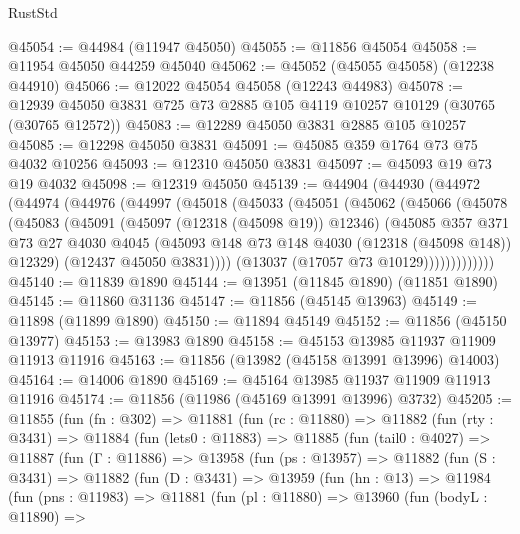 \begin{lexlean}{RustStd}
\begin{coremodule}
@45054 := @44984 (@11947 @45050)
@45055 := @11856 @45054
@45058 := @11954 @45050 @44259 @45040
@45062 := @45052 (@45055 @45058) (@12238 @44910)
@45066 := @12022 @45054 @45058 (@12243 @44983)
@45078 := @12939 @45050 @3831 @725 @73 @2885 @105 @4119 @10257 @10129 (@30765 (@30765 @12572))
@45083 := @12289 @45050 @3831 @2885 @105 @10257
@45085 := @12298 @45050 @3831
@45091 := @45085 @359 @1764 @73 @75 @4032 @10256
@45093 := @12310 @45050 @3831
@45097 := @45093 @19 @73 @19 @4032
@45098 := @12319 @45050
@45139 := @44904
    (@44930
      (@44972
        (@44974
          (@44976
            (@44997
              (@45018
                (@45033
                  (@45051
                    (@45062
                      (@45066
                        (@45078
                          (@45083
                            (@45091
                              (@45097 (@12318 (@45098 @19)) @12346)
                              (@45085
                                @357
                                @371
                                @73
                                @27
                                @4030
                                @4045
                                (@45093 @148 @73 @148 @4030 (@12318 (@45098 @148)) @12329)
                                (@12437 @45050 @3831))))
                          (@13037 (@17057 @73 @10129)))))))))))))
@45140 := @11839 @1890
@45144 := @13951 (@11845 @1890) (@11851 @1890)
@45145 := @11860 @31136
@45147 := @11856 (@45145 @13963)
@45149 := @11898 (@11899 @1890)
@45150 := @11894 @45149
@45152 := @11856 (@45150 @13977)
@45153 := @13983 @1890
@45158 := @45153 @13985 @11937 @11909 @11913 @11916
@45163 := @11856 (@13982 (@45158 @13991 @13996) @14003)
@45164 := @14006 @1890
@45169 := @45164 @13985 @11937 @11909 @11913 @11916
@45174 := @11856 (@11986 (@45169 @13991 @13996) @3732)
@45205 := @11855
    (fun (fn : @302) =>
    @11881
      (fun (rc : @11880) =>
      @11882
        (fun (rty : @3431) =>
        @11884
          (fun (lets0 : @11883) =>
          @11885
            (fun (tail0 : @4027) =>
            @11887
              (fun (Γ : @11886) =>
              @13958
                (fun (ps : @13957) =>
                @11882
                  (fun (S : @3431) =>
                  @11882
                    (fun (D : @3431) =>
                    @13959
                      (fun (hn : @13) =>
                      @11984
                        (fun (pns : @11983) =>
                        @11881
                          (fun (pl : @11880) =>
                          @13960
                            (fun (bodyL : @11890) =>

\end{coremodule}
\end{lexlean}
